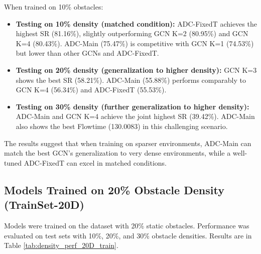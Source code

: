 When trained on 10\% obstacles:
\begin{itemize}
    \item \textbf{Testing on 10\% density (matched condition):} ADC-FixedT achieves the highest SR (81.16\%), slightly outperforming GCN K=2 (80.95\%) and GCN K=4 (80.43\%). ADC-Main (75.47\%) is competitive with GCN K=1 (74.53\%) but lower than other GCNs and ADC-FixedT.
    \item \textbf{Testing on 20\% density (generalization to higher density):} GCN K=3 shows the best SR (58.21\%). ADC-Main (55.88\%) performs comparably to GCN K=4 (56.34\%) and ADC-FixedT (55.53\%).
    \item \textbf{Testing on 30\% density (further generalization to higher density):} ADC-Main and GCN K=4 achieve the joint highest SR (39.42\%). ADC-Main also shows the best Flowtime (130.0083) in this challenging scenario.
\end{itemize}
The results suggest that when training on sparser environments, ADC-Main can match the best GCN's generalization to very dense environments, while a well-tuned ADC-FixedT can excel in matched conditions.

\subsection{Models Trained on 20\% Obstacle Density (TrainSet-20D)}
\label{subsec:perf_20D_train_detailed}
Models were trained on the dataset with 20\% static obstacles. Performance was evaluated on test sets with 10\%, 20\%, and 30\% obstacle densities. Results are in Table \ref{tab:density_perf_20D_train}.

